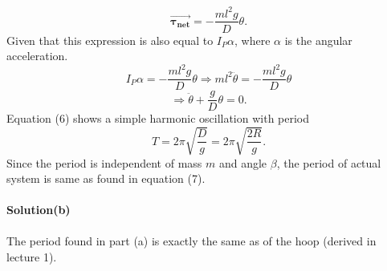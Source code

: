 \documentclass[12pt,a4paper]{article}
\begin{document}
\[\boldsymbol{\Vec{\tau_{\text{net}}}}=-\frac{ml^2g}{D}\theta.\]
Given that this expression is also equal to $I_P\alpha$, where $\alpha$ is the angular acceleration.
\[I_P\alpha=-\frac{ml^2g}{D}\theta\Rightarrow ml^2\ddot{\theta}=-\frac{ml^2g}{D}\theta\]
\begin{equation}
   \Rightarrow\ddot{\theta}+\frac{g}{D}\theta=0.
\end{equation}
Equation (6) shows a simple harmonic oscillation with period
\begin{equation}
    T=2\pi\sqrt{\frac{D}{g}}=2\pi\sqrt{\frac{2R}{g}}.
\end{equation}
Since the period is independent of mass $m$ and angle $\beta$, the period of actual system is same as found in equation (7). 
\\
\\\textbf{Solution(b)}
\\
\\The period found in part (a) is exactly the same as of the hoop (derived in lecture 1). 
\end{document}
